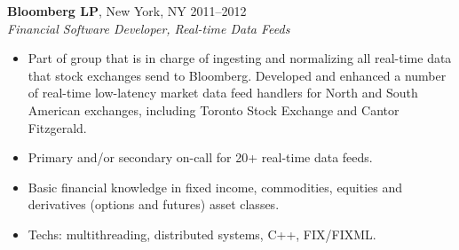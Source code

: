 \documentclass[line,margin]{res}
\begin{document}
\begin{resume}
                \textbf{Bloomberg LP}, New York, NY \hfill 2011--2012 \\
                {\sl Financial Software Developer, Real-time Data Feeds}
                \begin{itemize}  \itemsep -2pt
                \item Part of group that is in charge of ingesting and normalizing all real-time 
                data that stock exchanges send to Bloomberg.  Developed and enhanced a number of
                real-time low-latency market data feed handlers for North and South American exchanges, 
                including Toronto Stock Exchange and Cantor Fitzgerald.
                \item Primary and/or secondary on-call for 20+ real-time data feeds.
                \item Basic financial knowledge in fixed income, commodities, equities and derivatives 
                (options and futures) asset classes.
                \item Techs: multithreading, distributed systems, C++, FIX/FIXML.
                \end{itemize} 
                

\end{resume}
\end{document}
